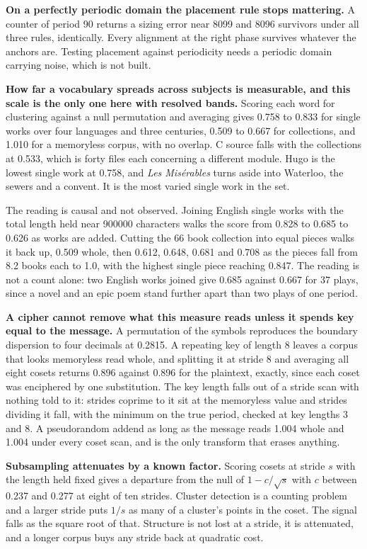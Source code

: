 \textbf{On a perfectly periodic domain the placement rule stops mattering.} A counter of period 90 returns a sizing error near 8099 and 8096 survivors under all three rules, identically. Every alignment at the right phase survives whatever the anchors are. Testing placement against periodicity needs a periodic domain carrying noise, which is not built.

\textbf{How far a vocabulary spreads across subjects is measurable, and this scale is the only one here with resolved bands.} Scoring each word for clustering against a null permutation and averaging gives 0.758 to 0.833 for single works over four languages and three centuries, 0.509 to 0.667 for collections, and 1.010 for a memoryless corpus, with no overlap. C source falls with the collections at 0.533, which is forty files each concerning a different module. Hugo is the lowest single work at 0.758, and \emph{Les Misérables} turns aside into Waterloo, the sewers and a convent. It is the most varied single work in the set.

The reading is causal and not observed. Joining English single works with the total length held near 900000 characters walks the score from 0.828 to 0.685 to 0.626 as works are added. Cutting the 66 book collection into equal pieces walks it back up, 0.509 whole, then 0.612, 0.648, 0.681 and 0.708 as the pieces fall from 8.2 books each to 1.0, with the highest single piece reaching 0.847. The reading is not a count alone: two English works joined give 0.685 against 0.667 for 37 plays, since a novel and an epic poem stand further apart than two plays of one period.

\textbf{A cipher cannot remove what this measure reads unless it spends key equal to the message.} A permutation of the symbols reproduces the boundary dispersion to four decimals at 0.2815. A repeating key of length 8 leaves a corpus that looks memoryless read whole, and splitting it at stride 8 and averaging all eight cosets returns 0.896 against 0.896 for the plaintext, exactly, since each coset was enciphered by one substitution. The key length falls out of a stride scan with nothing told to it: strides coprime to it sit at the memoryless value and strides dividing it fall, with the minimum on the true period, checked at key lengths 3 and 8. A pseudorandom addend as long as the message reads 1.004 whole and 1.004 under every coset scan, and is the only transform that erases anything.

\textbf{Subsampling attenuates by a known factor.} Scoring cosets at stride \(s\) with the length held fixed gives a departure from the null of \(1 - c/\sqrt{s}\) with \(c\) between 0.237 and 0.277 at eight of ten strides. Cluster detection is a counting problem and a larger stride puts \(1/s\) as many of a cluster's points in the coset. The signal falls as the square root of that. Structure is not lost at a stride, it is attenuated, and a longer corpus buys any stride back at quadratic cost.

